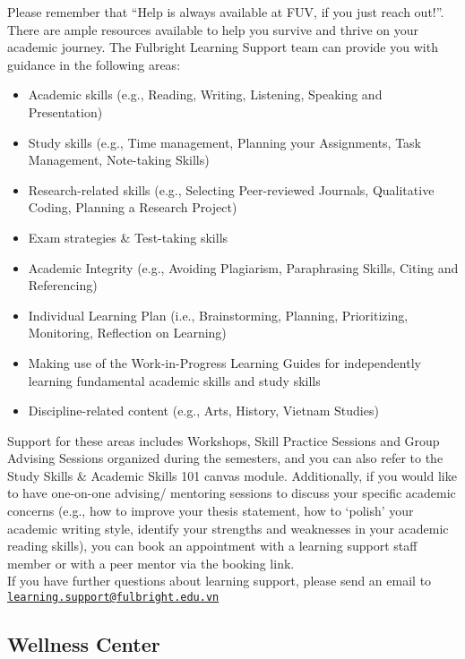 \documentclass[
]{article}
\providecommand{\tightlist}{%
  \setlength{\itemsep}{0pt}\setlength{\parskip}{0pt}}
\begin{document}
Please remember that ``Help is always available at FUV, if you just reach out!''. There are ample resources available to help you survive and thrive on your academic journey. The Fulbright Learning Support team can provide you with guidance in the following areas:

\begin{itemize}
\tightlist
\item
  Academic skills (e.g., Reading, Writing, Listening, Speaking and Presentation)
\item
  Study skills (e.g., Time management, Planning your Assignments, Task Management, Note-taking Skills)\\
\item
  Research-related skills (e.g., Selecting Peer-reviewed Journals, Qualitative Coding, Planning a Research Project)
\item
  Exam strategies \& Test-taking skills\\
\item
  Academic Integrity (e.g., Avoiding Plagiarism, Paraphrasing Skills, Citing and Referencing)
\item
  Individual Learning Plan (i.e., Brainstorming, Planning, Prioritizing, Monitoring, Reflection on Learning)
\item
  Making use of the Work-in-Progress Learning Guides for independently learning fundamental academic skills and study skills
\item
  Discipline-related content (e.g., Arts, History, Vietnam Studies)
\end{itemize}

Support for these areas includes Workshops, Skill Practice Sessions and Group Advising Sessions organized during the semesters, and you can also refer to the Study Skills \& Academic Skills 101 canvas module. Additionally, if you would like to have one-on-one advising/ mentoring sessions to discuss your specific academic concerns (e.g., how to improve your thesis statement, how to `polish' your academic writing style, identify your strengths and weaknesses in your academic reading skills), you can book an appointment with a learning support staff member or with a peer mentor via the booking link.\\
If you have further questions about learning support, please send an email to \href{mailto:learning.support@fulbright.edu.vn}{\nolinkurl{learning.support@fulbright.edu.vn}}

\subsection*{Wellness Center}\label{wellness-center}
\end{document}
